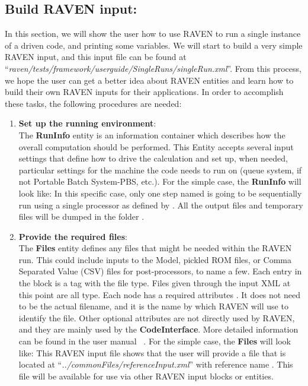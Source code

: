 \subsection{Build RAVEN input: }
In this section, we will show the user how to use RAVEN to run a single instance of a driven code, and
printing some variables. 
We will start to build a very simple RAVEN input, and this input file can be found at 
``\textit{raven/tests/framework/user\textunderscore guide/SingleRuns/singleRun.xml}''. 
From this process, we hope the user can get a better idea about
RAVEN entities and learn how to build their own RAVEN inputs for their applications.
In order to accomplish these tasks, the following procedures are needed:
\begin{enumerate}
   \item \textbf{Set up the running environment}: 
     \\The \textbf{RunInfo} entity is an information container which describes how the overall computation should
      be performed. This Entity accepts several input settings that define how to drive the calculation and set up,
      when needed, particular settings for the machine the code needs to run on (queue system, if not Portable
      Batch System-PBS, etc.). For the simple case, the \textbf{RunInfo} will look like:
      In this specific case, only one step named  is going to be sequentially run using a single
      processor as defined by . All the output files and temporary files will be dumped in the
      folder .

   \item \textbf{Provide the required files}: 
     \\ The \textbf{Files} entity  defines any files that might be needed within the RAVEN run. This could include
     inputs to the Model, pickled ROM files, or Comma Separated Value (CSV) files for post-processors, to name a few.
     Each entry in the  block is a tag with the file type. Files given through the input XML at this
     point are all  type. Each  node has a required attributes . It does
     not need to be the actual filename, and it is the name by which RAVEN will use to identify the file. Other
     optional attributes are not directly used by RAVEN, and they are mainly used by the \textbf{CodeInterface}. More
     detailed information can be found in the user manual ~\cite{RAVENuserManual}. For the simple case, the \textbf{Files}
     will look like:
     This RAVEN input file shows that the user will provide a file that is located at ``\textit{../commonFiles/referenceInput.xml}''
     with reference name . This file will be available for use via other RAVEN input blocks or entities.


\end{enumerate}
